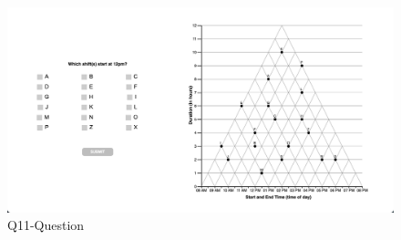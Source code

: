 \documentclass[
  letterpaper,
  DIV=11,
  numbers=noendperiod]{scrreprt}
\begin{document}
\begin{figure}

{\centering \includegraphics{analysis/SGC3A/static/questions/Q11.png}

}

\caption{\label{fig-Q11}Q11-Question}

\end{figure}
\end{document}

